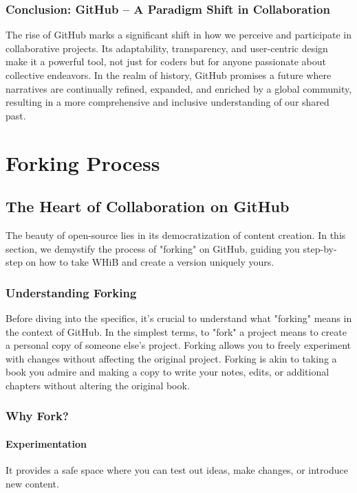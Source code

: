 \documentclass{book}
\begin{document}
\subsection*{Conclusion: GitHub – A Paradigm Shift in Collaboration}
The rise of GitHub marks a significant shift in how we perceive and participate in collaborative projects. Its adaptability, transparency, and user-centric design make it a powerful tool, not just for coders but for anyone passionate about collective endeavors. In the realm of history, GitHub promises a future where narratives are continually refined, expanded, and enriched by a global community, resulting in a more comprehensive and inclusive understanding of our shared past.

\chapter{Forking Process}
\section*{The Heart of Collaboration on GitHub}
The beauty of open-source lies in its democratization of content creation. In this section, we demystify the process of "forking" on GitHub, guiding you step-by-step on how to take WHiB and create a version uniquely yours.

\subsection*{Understanding Forking}
Before diving into the specifics, it's crucial to understand what "forking" means in the context of GitHub. In the simplest terms, to "fork" a project means to create a personal copy of someone else's project. Forking allows you to freely experiment with changes without affecting the original project. Forking is akin to taking a book you admire and making a copy to write your notes, edits, or additional chapters without altering the original book.

\subsection*{Why Fork?}
\subsubsection*{Experimentation}
It provides a safe space where you can test out ideas, make changes, or introduce new content.
\end{document}
